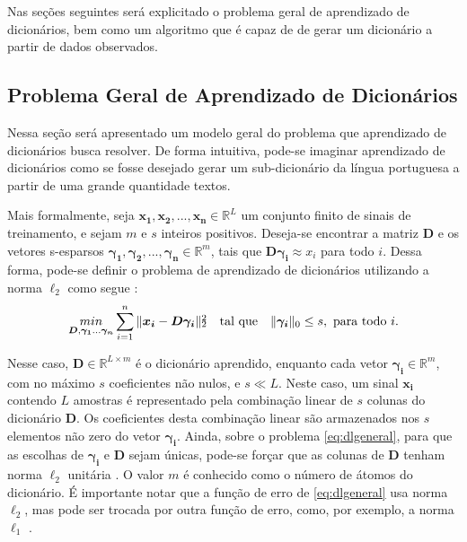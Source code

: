 \documentclass[cic,tc]{iiufrgs}
\def\SPSB#1#2{\rlap{\textsuperscript{#1}}\SB{#2}}
\def\SB#1{\textsubscript{#1}}
\renewcommand{\vec}[1]{\bm{#1}}
\newcommand{\mat}[1]{\bm{#1}}
\begin{document}
Nas seções seguintes será explicitado o problema geral de aprendizado de dicionários, bem como 
um algoritmo que é capaz de de gerar um dicionário a partir de dados observados.

\subsection{Problema Geral de Aprendizado de Dicionários}
Nessa seção será apresentado um modelo geral do problema que aprendizado de dicionários busca resolver.
De forma intuitiva, pode-se imaginar aprendizado de dicionários como se fosse desejado gerar 
um sub-dicionário da língua portuguesa a partir de uma grande quantidade textos.

Mais formalmente, seja $\vec{x_1}, \vec{x_2}, ..., \vec{x_n} \in \mathbb{R}^L$
um conjunto finito de sinais de treinamento, e sejam $m$ e $s$ inteiros positivos.
Deseja-se encontrar a matriz $\mat{D}$ e os vetores s-esparsos
$\vec{\gamma_1}, \vec{\gamma_2}, ..., \vec{\gamma_n} \in \mathbb{R}^m$, tais que
$\mat{D}\vec{\gamma_i} \approx x_i$ para todo $i$. Dessa forma, pode-se definir o problema
de aprendizado de dicionários utilizando a norma $\ell_2$ como segue  \cite{chen2015compressed}:
\begin{equation}
    \label{eq:dlgeneral}
    \underset{\mat{D}, \vec{\gamma_1}...\vec{\gamma_n}}{min} 
    \sum_{i=1}^{n} {\lVert  \vec{x_i} - \mat{D} \vec{\gamma_i} \rVert \SPSB{2}{2}}
    \hspace{1em} \text{tal que} \hspace{1em}
    \lVert \vec{\gamma_i} \rVert_0 \le s, \text{ para todo } i.
\end{equation}

Nesse caso, $\mat{D} \in \mathbb{R}^{L\times m}$ é o dicionário aprendido, enquanto 
cada vetor $\vec{\gamma_i} \in \mathbb{R}^m$, com no máximo $s$ coeficientes não nulos, 
e $s\ll L$. 
Neste caso, um sinal $\vec{x_i}$ contendo $L$ amostras é representado pela combinação linear de $s$ 
colunas do dicionário $\mat{D}$. 
Os coeficientes desta combinação linear são armazenados nos $s$ elementos não zero 
do vetor $\vec{\gamma_i}$.
Ainda, sobre o problema \eqref{eq:dlgeneral}, para que as escolhas
de $\vec{\gamma_i}$ e $\mat{D}$ sejam únicas, pode-se forçar que as colunas de $\mat{D}$ 
tenham norma $\ell_2$
unitária \cite{chen2015compressed}. O valor $m$ é conhecido como o número de átomos do 
dicionário.
É importante notar que a função de erro de \eqref{eq:dlgeneral} usa norma $\ell_2$, mas pode ser trocada
por outra função de erro, como, por exemplo, a norma $\ell_1$ \cite{chen2015compressed}.
\end{document}
